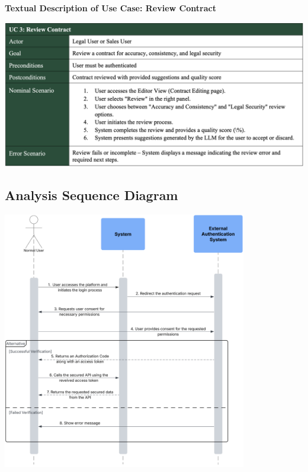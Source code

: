 \vspace{0.3cm}
\newpage

\textbf{Textual Description of Use Case: Review Contract}\vspace{-0.3cm}

\begin{center}
    \centering
    \includegraphics[width=1\textwidth]{Images/Review Contract Use Case.png}
    \label{tab:review_contract_use_case}
\end{center}

\subsection{Analysis Sequence Diagram}

\vspace{0.4cm}

\begin{center}
    \centering
    \includegraphics[width=0.8\textwidth]{Images/Analysis Sequence Diagram.png}
    \label{fig:analysis_sequence_diagram}
\end{center}

